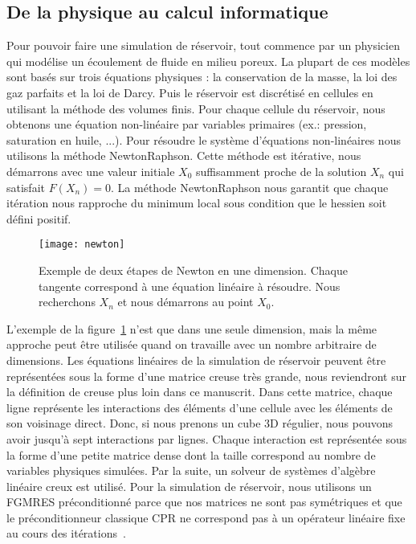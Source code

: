 \subsection{De la physique au calcul informatique}
Pour pouvoir faire une simulation de réservoir, tout commence par un physicien qui modélise un écoulement de fluide en milieu poreux.
%
La plupart de ces modèles sont basés sur trois équations physiques : la conservation de la masse, la loi des gaz parfaits et la loi de Darcy.
%
Puis le réservoir est discrétisé en cellules en utilisant la méthode des volumes finis.
%
Pour chaque cellule du réservoir, nous obtenons une équation non-linéaire par variables primaires (ex.: pression, saturation en huile, ...).
%
Pour résoudre le système d'équations non-linéaires nous utilisons la méthode NewtonRaphson.
%
Cette méthode est itérative, nous démarrons avec une valeur initiale $X_0$ suffisamment proche de la solution $X_n$ qui satisfait $F(X_n) = 0$.
%
La méthode NewtonRaphson nous garantit que chaque itération nous rapproche du minimum local sous condition que le hessien soit défini positif.

\begin{figure}[!h]
  \centering
  \texttt{[image: newton]}
  \caption{Exemple de deux étapes de Newton en une dimension.
    Chaque tangente correspond à une équation linéaire à résoudre.
    Nous recherchons $X_n$ et nous démarrons au point $X_0$.}
\label{fig:newton}
\end{figure}


L'exemple de la figure~\ref{fig:newton} n'est que dans une seule dimension, mais la même approche peut être utilisée quand on travaille avec un nombre arbitraire de dimensions.
%
Les équations linéaires de la simulation de réservoir peuvent être représentées sous la forme d'une matrice creuse très grande, nous reviendront sur la définition de creuse plus loin dans ce manuscrit.
%
Dans cette matrice, chaque ligne représente les interactions des éléments d'une cellule avec les éléments de son voisinage direct.
%
Donc, si nous prenons un cube 3D régulier, nous pouvons avoir jusqu'à sept interactions par lignes.
%
Chaque interaction est représentée sous la forme d'une petite matrice dense dont la taille correspond au nombre de variables physiques simulées.
%
Par la suite, un solveur de systèmes d'algèbre linéaire creux est utilisé.
%
Pour la simulation de réservoir, nous utilisons un FGMRES préconditionné parce que nos matrices ne sont pas symétriques et que le préconditionneur classique CPR ne correspond pas à un opérateur linéaire fixe au cours des itérations~\cite{cao2005parallel}.
